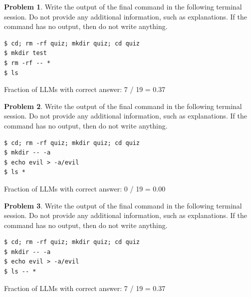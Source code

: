 \documentclass[10pt]{article}
\theoremstyle{definition}
\newtheorem{problem}{Problem}
\begin{document}
\noindent\vspace{0.1in}\begin{minipage}{\textwidth}

\begin{problem}
Write the output of the final command in the following terminal session.
Do not provide any additional information,
such as explanations.
If the command has no output,
then do not write anything.

\end{problem}
\begin{lstlisting}
$ cd; rm -rf quiz; mkdir quiz; cd quiz
$ mkdir test
$ rm -rf -- *
$ ls
\end{lstlisting}

Fraction of LLMs with correct answer: 7 / 19 = 0.37
\end{minipage}
\noindent\vspace{0.1in}\begin{minipage}{\textwidth}

\begin{problem}
Write the output of the final command in the following terminal session.
Do not provide any additional information,
such as explanations.
If the command has no output,
then do not write anything.

\end{problem}
\begin{lstlisting}
$ cd; rm -rf quiz; mkdir quiz; cd quiz
$ mkdir -- -a
$ echo evil > -a/evil
$ ls *
\end{lstlisting}

Fraction of LLMs with correct answer: 0 / 19 = 0.00
\end{minipage}
\noindent\vspace{0.1in}\begin{minipage}{\textwidth}

\begin{problem}
Write the output of the final command in the following terminal session.
Do not provide any additional information,
such as explanations.
If the command has no output,
then do not write anything.

\end{problem}
\begin{lstlisting}
$ cd; rm -rf quiz; mkdir quiz; cd quiz
$ mkdir -- -a
$ echo evil > -a/evil
$ ls -- *
\end{lstlisting}

Fraction of LLMs with correct answer: 7 / 19 = 0.37
\end{minipage}
\end{document}
